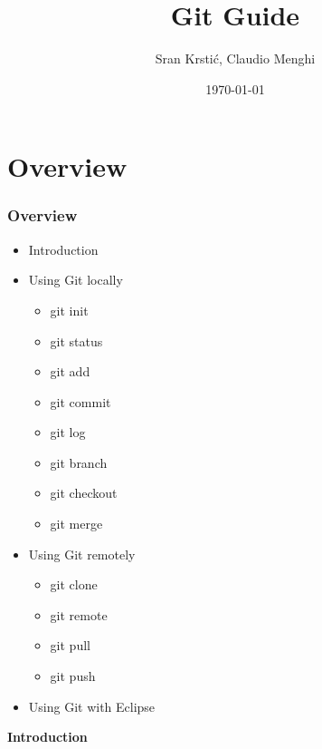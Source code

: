 \documentclass{beamer}
\title[Git Guide]{Git Guide} %
\author{Sr\dj{}an Krsti\'c, Claudio Menghi} %
\institute[] %
{
Politecnico di Milano \\ %
\medskip
\textit{srdan.krstic@polimi.it, claudio.menghi@polimi.it} %
}
\date{\today} %
\begin{document}
\begin{frame}
\titlepage %
\end{frame}





\section{Overview}
\begin{frame}
\frametitle{Overview}


\begin{itemize}
\item Introduction
\item Using Git locally
  \begin{itemize}
  \item git init
  \item git status
  \item git add
  \item git commit
  \item git log
  \item git branch
  \item git checkout
  \item git merge
  \end{itemize}
\item Using Git remotely
  \begin{itemize}
  \item git clone
  \item git remote
  \item git pull
  \item git push
  \end{itemize}
\item Using Git with Eclipse
\end{itemize}
\end{frame}





\begin{frame}

\LARGE	
\textbf{Introduction}


\end{frame}
\end{document}
